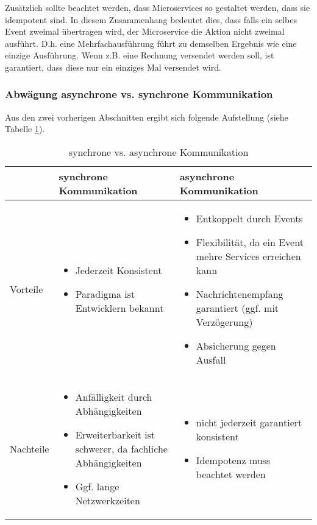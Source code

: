 Zusätzlich sollte beachtet werden, dass Microservices so gestaltet werden, dass sie idempotent sind. In diesem Zusammenhang bedeutet dies, dass falls ein selbes Event zweimal übertragen wird, der Microservice die Aktion nicht zweimal ausführt. D.h. eine Mehrfachausführung führt zu demselben Ergebnis wie eine einzige Ausführung. Wenn z.B. eine Rechnung versendet werden soll, ist garantiert, dass diese nur ein einziges Mal versendet wird.\cite{wolff2018mic_praxis} \\

\subsubsection{Abwägung asynchrone vs. synchrone Kommunikation}

Aus den zwei vorherigen Abschnitten ergibt sich folgende Aufstellung (siehe Tabelle \ref{tab:sync_vs_async_table}).

\begin{table}[H]
	\begin{center}
		\begin{tabular}{p{}p{5cm}p{5cm}}
			& synchrone Kommunikation & asynchrone Kommunikation \\ \hline
			 Vorteile
			&
				\begin{itemize}
					\item Jederzeit Konsistent
					\item Paradigma ist Entwicklern bekannt\cite{wolff2018mic_praxis}
				\end{itemize} 
			& 
				\begin{itemize}
					\item Entkoppelt durch Events 
					\item Flexibilität, da ein Event mehre Services erreichen kann
					\item Nachrichtenempfang garantiert (ggf. mit Verzögerung)
					\item Absicherung gegen Ausfall
				\end{itemize} 
  			\\
			Nachteile
		  &
 			  	\begin{itemize}
				 	\item Anfälligkeit durch Abhängigkeiten 
				 	\item Erweiterbarkeit ist schwerer, da fachliche Abhängigkeiten
				 	\item Ggf. lange Netzwerkzeiten
				 \end{itemize}
		  & 
		 	\begin{itemize}
		 		\item nicht jederzeit garantiert konsistent
		 		\item Idempotenz muss beachtet werden
	 		\end{itemize}  \\
		\end{tabular}
	\end{center}
	\caption[synchrone vs. asynchrone Kommunikation]{synchrone vs. asynchrone Kommunikation}
	\label{tab:sync_vs_async_table} 
\end{table}

